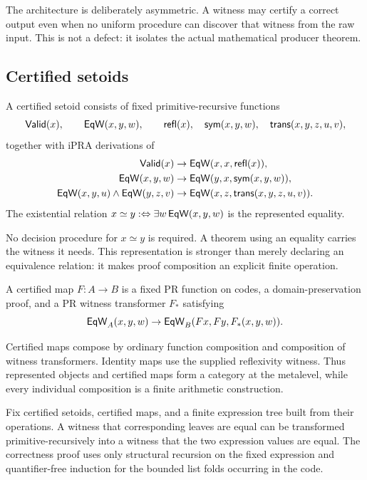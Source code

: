 The architecture is deliberately asymmetric.  A witness may certify a correct output even when no
uniform procedure can discover that witness from the raw input.  This is not a defect: it isolates
the actual mathematical producer theorem.

\subsection{Certified setoids}

\begin{definition}
A certified setoid consists of fixed primitive-recursive functions
\[
\mathsf{Valid}(x),\qquad \mathsf{EqW}(x,y,w),\qquad
\mathsf{refl}(x),\quad \mathsf{sym}(x,y,w),\quad
\mathsf{trans}(x,y,z,u,v),
\]
together with iPRA derivations of
\begin{align*}
  \mathsf{Valid}(x)&\to \mathsf{EqW}(x,x,\mathsf{refl}(x)),\\
  \mathsf{EqW}(x,y,w)&\to \mathsf{EqW}(y,x,\mathsf{sym}(x,y,w)),\\
  \mathsf{EqW}(x,y,u)\wedge\mathsf{EqW}(y,z,v)
    &\to \mathsf{EqW}(x,z,\mathsf{trans}(x,y,z,u,v)).
\end{align*}
The existential relation $x\simeq y :\Leftrightarrow \exists w\,\mathsf{EqW}(x,y,w)$ is the represented
equality.
\end{definition}

No decision procedure for $x\simeq y$ is required.  A theorem using an equality carries the witness
it needs.  This representation is stronger than merely declaring an equivalence relation: it makes
proof composition an explicit finite operation.

\begin{definition}
A certified map $F:A\to B$ is a fixed PR function on codes, a domain-preservation proof, and a PR
witness transformer $F_*$ satisfying
\[
   \mathsf{EqW}_A(x,y,w)\to \mathsf{EqW}_B(Fx,Fy,F_*(x,y,w)).
\]
\end{definition}

Certified maps compose by ordinary function composition and composition of witness transformers.
Identity maps use the supplied reflexivity witness.  Thus represented objects and certified maps
form a category at the metalevel, while every individual composition is a finite arithmetic
construction.

\begin{proposition}
Fix certified setoids, certified maps, and a finite expression tree built from their operations.  A
witness that corresponding leaves are equal can be transformed primitive-recursively into a witness
that the two expression values are equal.  The correctness proof uses only structural recursion on
the fixed expression and quantifier-free induction for the bounded list folds occurring in the
code.
\end{proposition}

